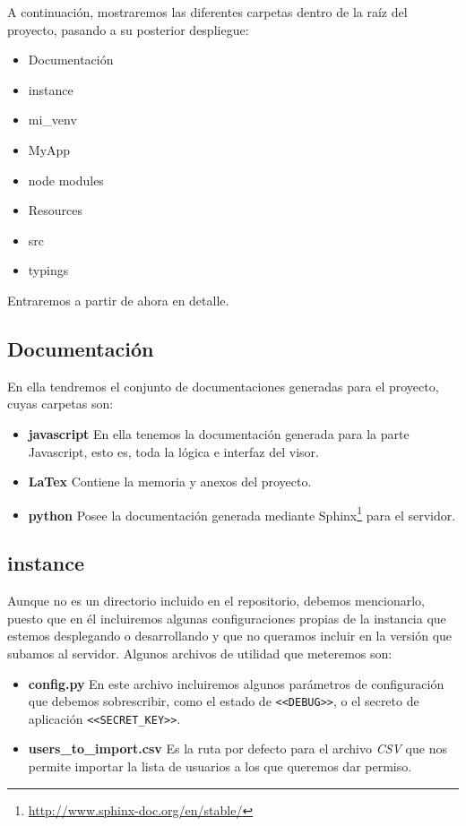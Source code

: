 A continuación, mostraremos las diferentes carpetas dentro de la raíz del proyecto, pasando a su posterior despliegue:

\begin{itemize}
	\item Documentación
	\item instance
	\item mi\_venv
	\item MyApp
	\item node modules
	\item Resources
	\item src
	\item typings
\end{itemize}

\noindent Entraremos a partir de ahora en detalle.

\subsection{Documentación}
En ella tendremos el conjunto de documentaciones generadas para el proyecto, cuyas carpetas son:
\begin{itemize}
	\item \textbf{javascript} En ella tenemos la documentación generada para la parte Javascript, esto es, toda la lógica e interfaz del visor.
	\item \textbf{LaTex} Contiene la memoria y anexos del proyecto.
	\item \textbf{python} Posee la documentación generada mediante Sphinx\footnote{\url{http://www.sphinx-doc.org/en/stable/}} para el servidor.
\end{itemize}

\subsection{instance}
Aunque no es un directorio incluido en el repositorio, debemos mencionarlo, puesto que en él incluiremos algunas configuraciones propias de la instancia que estemos desplegando o desarrollando y que no queramos incluir en la versión que subamos al servidor. Algunos archivos de utilidad que meteremos son:
\begin{itemize}
	\item \textbf{config.py} En este archivo incluiremos algunos parámetros de configuración que debemos sobrescribir, como el estado de \texttt{<<DEBUG>>}, o el secreto de aplicación \texttt{<<SECRET\_KEY>>}.
	\item \textbf{users\_to\_import.csv} Es la ruta por defecto para el archivo \textit{CSV} que nos permite importar la lista de usuarios a los que queremos dar permiso.
\end{itemize}

